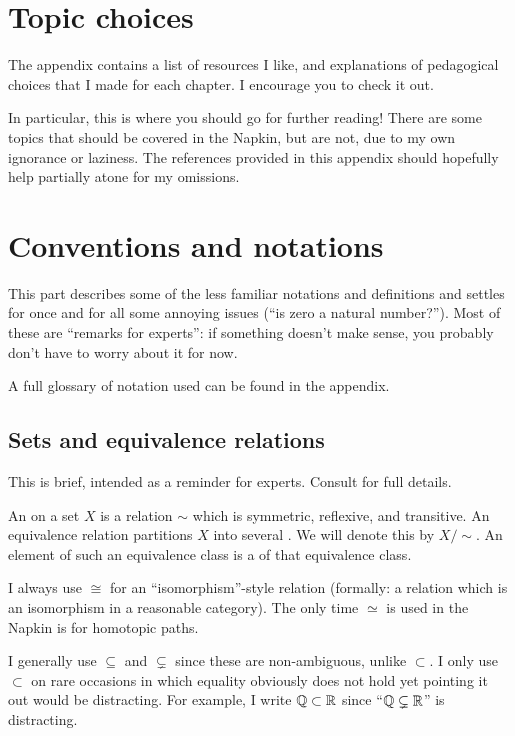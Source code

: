 \section{Topic choices}
The appendix contains a list of resources I like,
and explanations of pedagogical choices that I made for each chapter.
I encourage you to check it out.

In particular, this is where you should go for further reading!
There are some topics that should be covered in the Napkin,
but are not, due to my own ignorance or laziness.
The references provided in this appendix should hopefully help partially
atone for my omissions.

\section{Conventions and notations}
This part describes some of the less familiar notations and definitions
and settles for once and for all some annoying issues (``is zero a natural number?'').
Most of these are ``remarks for experts'':
if something doesn't make sense, you probably don't have to worry about it for now.

A full glossary of notation used can be found in the appendix.

\subsection*{Sets and equivalence relations}
This is brief, intended as a reminder for experts.
Consult  for full details.

An  on a set $X$ is a relation $\sim$
which is symmetric, reflexive, and transitive.
An equivalence relation partitions $X$ into several .
We will denote this by $X / {\sim}$.
An element of such an equivalence class is a  of that equivalence class.

I always use $\cong$ for an ``isomorphism''-style relation
(formally: a relation which is an isomorphism in a reasonable category).
The only time $\simeq$ is used in the Napkin is for homotopic paths.

I generally use $\subseteq$ and $\subsetneq$ since these are non-ambiguous,
unlike $\subset$.  I only use $\subset$ on rare occasions in which equality
obviously does not hold yet pointing it out would be distracting.
For example, I write $\mathbb Q \subset \mathbb R$
since ``$\mathbb Q \subsetneq \mathbb R$'' is distracting.

